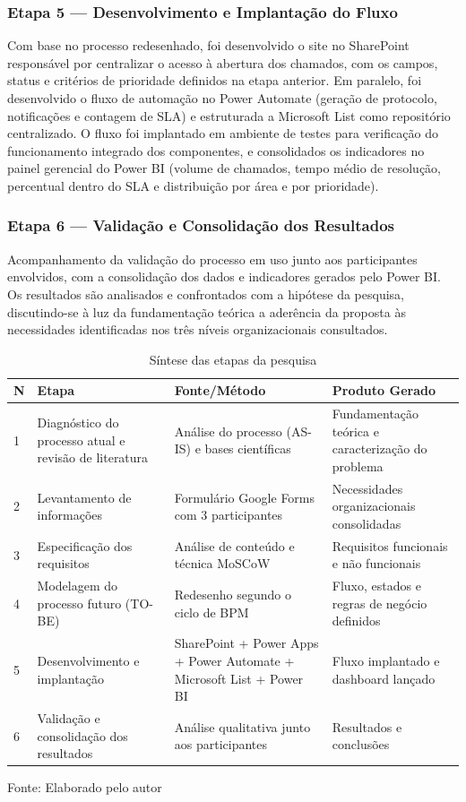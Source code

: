 \subsubsection{Etapa 5 --- Desenvolvimento e Implantação do
Fluxo}

Com base no processo redesenhado, foi desenvolvido o site no
SharePoint responsável por centralizar o acesso à abertura dos
chamados, com os campos, status e critérios de prioridade
definidos na etapa anterior. Em paralelo, foi desenvolvido o
fluxo de automação no Power Automate (geração de protocolo,
notificações e contagem de SLA) e estruturada a Microsoft
List como repositório centralizado. O fluxo foi implantado em
ambiente de testes para verificação do funcionamento
integrado dos componentes, e consolidados os indicadores no
painel gerencial do Power BI (volume de chamados, tempo médio
de resolução, percentual dentro do SLA e distribuição por
área e por prioridade).

\subsubsection{Etapa 6 --- Validação e Consolidação dos
Resultados}

Acompanhamento da validação do processo em uso junto aos
participantes envolvidos, com a consolidação dos dados e
indicadores gerados pelo Power BI. Os resultados são
analisados e confrontados com a hipótese da pesquisa,
discutindo-se à luz da fundamentação teórica a aderência da
proposta às necessidades identificadas nos três níveis
organizacionais consultados.

\begin{table}[H]
\caption{Síntese das etapas da pesquisa}
\label{tab:etapas}
\centering
\begin{tabular}{p{0.5cm} p{3.6cm} p{3.6cm} p{4.4cm}}
\hline
\textbf{N} & \textbf{Etapa} & \textbf{Fonte/Método} &
\textbf{Produto Gerado} \\
\hline
1 & Diagnóstico do processo atual e revisão de literatura &
Análise do processo (AS-IS) e bases científicas &
Fundamentação teórica e caracterização do problema \\
\hline
2 & Levantamento de informações & Formulário Google Forms
com 3 participantes & Necessidades organizacionais
consolidadas \\
\hline
3 & Especificação dos requisitos & Análise de conteúdo e
técnica MoSCoW & Requisitos funcionais e não funcionais \\
\hline
4 & Modelagem do processo futuro (TO-BE) & Redesenho segundo
o ciclo de BPM & Fluxo, estados e regras de negócio
definidos \\
\hline
5 & Desenvolvimento e implantação & SharePoint + Power Apps +
Power Automate + Microsoft List + Power BI & Fluxo implantado
e dashboard lançado \\
\hline
6 & Validação e consolidação dos resultados & Análise
qualitativa junto aos participantes & Resultados e conclusões \\
\hline
\end{tabular}
\raggedright
\par
{\fontsize{10}{12}\selectfont Fonte: Elaborado pelo autor}
\end{table}

